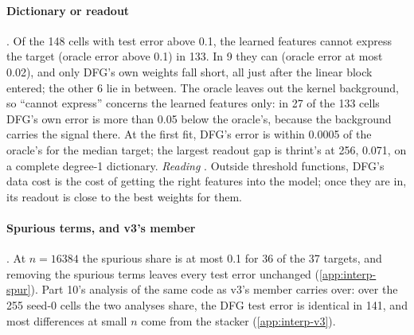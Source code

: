\paragraph{Dictionary or readout} . Of the 148 cells with test error above 0.1, the learned features cannot express the target (oracle error above 0.1) in 133. In 9 they can (oracle error at most 0.02), and only DFG's own weights fall short, all just after the linear block entered; the other 6 lie in between. The oracle leaves out the kernel background, so ``cannot express'' concerns the learned features only: in 27 of the 133 cells DFG's own error is more than 0.05 below the oracle's, because the background carries the signal there. At the first fit, DFG's error is within 0.0005 of the oracle's for the median target; the largest readout gap is thrint's at 256, 0.071, on a complete degree-1 dictionary. \emph{Reading} . Outside threshold functions, DFG's data cost is the cost of getting the right features into the model; once they are in, its readout is close to the best weights for them.

\paragraph{Spurious terms, and v3's member} . At $n=16384$ the spurious share is at most 0.1 for 36 of the 37 targets, and removing the spurious terms leaves every test error unchanged (\cref{app:interp-spur}). Part 10's analysis of the same code as v3's member \cite{portfoliolearner2026} carries over: over the 255 seed-0 cells the two analyses share, the DFG test error is identical in 141, and most differences at small $n$ come from the stacker (\cref{app:interp-v3}).



